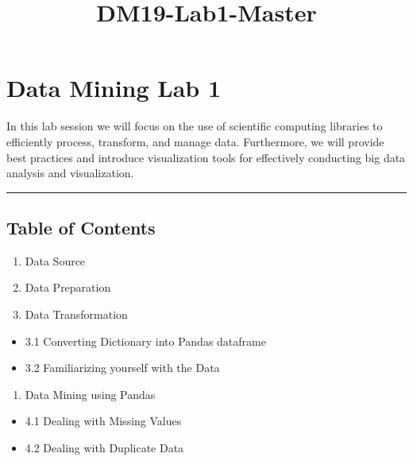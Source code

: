 \documentclass[11pt]{article}
\title{DM19-Lab1-Master}
\providecommand{\tightlist}{%
      \setlength{\itemsep}{0pt}\setlength{\parskip}{0pt}}
\begin{document}
    
    
    \maketitle
    
    

    
    \hypertarget{data-mining-lab-1}{%
\section{Data Mining Lab 1}\label{data-mining-lab-1}}

In this lab session we will focus on the use of scientific computing
libraries to efficiently process, transform, and manage data.
Furthermore, we will provide best practices and introduce visualization
tools for effectively conducting big data analysis and visualization.

    \begin{center}\rule{0.5\linewidth}{\linethickness}\end{center}

    \hypertarget{table-of-contents}{%
\subsection{Table of Contents}\label{table-of-contents}}

\begin{enumerate}
\def\labelenumi{\arabic{enumi}.}
\tightlist
\item
  Data Source
\item
  Data Preparation
\item
  Data Transformation
\end{enumerate}

\begin{itemize}
\tightlist
\item
  3.1 Converting Dictionary into Pandas dataframe
\item
  3.2 Familiarizing yourself with the Data
\end{itemize}

\begin{enumerate}
\def\labelenumi{\arabic{enumi}.}
\setcounter{enumi}{3}
\tightlist
\item
  Data Mining using Pandas
\end{enumerate}

\begin{itemize}
\tightlist
\item
  4.1 Dealing with Missing Values
\item
  4.2 Dealing with Duplicate Data
\end{itemize}
\end{document}
